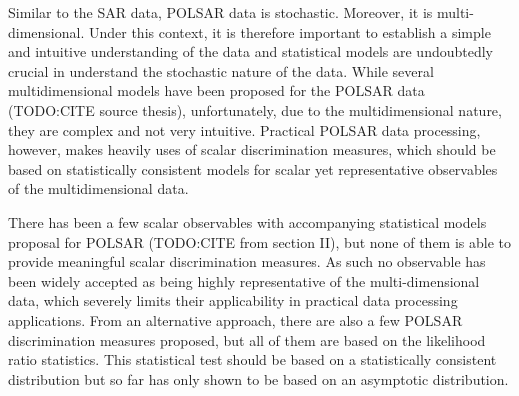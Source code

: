 \documentclass[journal]{IEEEtran}
\begin{document}
Similar to the SAR data, POLSAR data is stochastic.
Moreover, it is multi-dimensional.
Under this context, it is therefore important to establish a simple and intuitive understanding of the data
  and statistical models are undoubtedly crucial in understand the stochastic nature of the data.
While several multidimensional models have been proposed for the POLSAR data (TODO:CITE source thesis),
  unfortunately, due to the multidimensional nature, they are complex and not very intuitive.
Practical POLSAR data processing, however, makes heavily uses of scalar discrimination measures,
  which should be based on statistically consistent models for scalar yet representative observables of the multidimensional data.

There has been a few scalar observables with accompanying statistical models proposal for POLSAR (TODO:CITE from section II),
  but none of them is able to provide meaningful scalar discrimination measures.
As such no observable has been widely accepted as being highly representative of the multi-dimensional data,
  which severely limits their applicability in practical data processing applications.
From an alternative approach, there are also a few POLSAR discrimination measures proposed,
  but all of them are based on the likelihood ratio statistics.
This statistical test should be based on a statistically consistent distribution
  but so far has only shown to be based on an asymptotic distribution.
\end{document}
